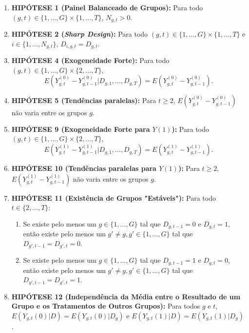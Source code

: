 \documentclass[portugues]{article}
\begin{document}
\begin{boxB}
    \begin{enumerate}

        \item \textbf{HIPÓTESE 1 (Painel Balanceado de Grupos):} Para todo $(g,t) \in \{1,\ldots,G\} \times \{1,\ldots,T\}$, $N_{g,t} > 0$.

        \item \textbf{HIPÓTESE 2 (\textit{Sharp Design}):} Para todo $(g,t) \in \{1,\ldots,G\} \times \{1,\ldots,T\}$ e $i \in \{1,\ldots, N_{g,t}\}$, $D_{i,g,t} = D_{g,t}$.

        \item \textbf{HIPÓTESE 4 (Exogeneidade Forte):} Para todo $(g,t) \in \{1,\ldots,G\} \times \{2,\ldots,T\}$,
$$E\left(Y_{g,t}^{(0)} - Y_{g,t-1}^{(0)} | D_{g,1},\ldots, D_{g,T}\right) = E\left(Y_{g,t}^{(0)} - Y_{g,t-1}^{(0)}\right).$$

        \item \textbf{HIPÓTESE 5 (Tendências paralelas):} Para $t \geq 2$, $E(Y_{g,t}^{(0)} - Y_{g,t-1}^{(0)})$ não varia entre os grupos $g$.

        \item \textbf{HIPÓTESE 9 (Exogeneidade Forte para $Y(1)$):} Para todo $(g,t) \in \{1,\ldots,G\} \times \{2,\ldots,T\}$, 
$$E\left(Y_{g,t}^{(1)} - Y_{g,t-1}^{(1)} | D_{g,1},\ldots, D_{g,T}\right) = E\left(Y_{g,t}^{(1)} - Y_{g,t-1}^{(1)}\right).$$

        \item \textbf{HIPÓTESE 10 (Tendências paralelas para $Y(1)$):} Para $t \geq 2$, $E(Y_{g,t}^{(1)} - Y_{g,t-1}^{(1)})$ não varia entre os grupos $g$.

        \item \textbf{HIPÓTESE 11 (Existência de Grupos "Estáveis"):} Para todo $t \in \{2,\ldots,T\}$:
        \begin{enumerate}
            \item Se existe pelo menos um $g \in \{1,\ldots,G\}$ tal que $D_{g,t-1} = 0$ e $D_{g,t} = 1$, então existe pelo menos um $g' \neq g, g' \in \{1,\ldots,G\}$ tal que $D_{g',t-1} = D_{g',t} = 0$.
            \item Se existe pelo menos um $g \in \{1,\ldots,G\}$ tal que $D_{g,t-1} = 1$ e $D_{g,t} = 0$, então existe pelo menos um $g' \neq g, g' \in \{1,\ldots,G\}$ tal que $D_{g',t-1} = D_{g',t} = 1$.
        \end{enumerate}

        \item \textbf{HIPÓTESE 12 (Independência da Média entre o Resultado de um Grupo e os Tratamentos de Outros Grupos):} Para todos $g$ e $t$, $E(Y_{g,t}(0)|D) = E(Y_{g,t}(0)|D_g)$ e $E(Y_{g,t}(1)|D) = E(Y_{g,t}(1)|D_g)$.
        
                 
    \end{enumerate}
    \cite{de2020two}
\end{boxB}
\end{document}
